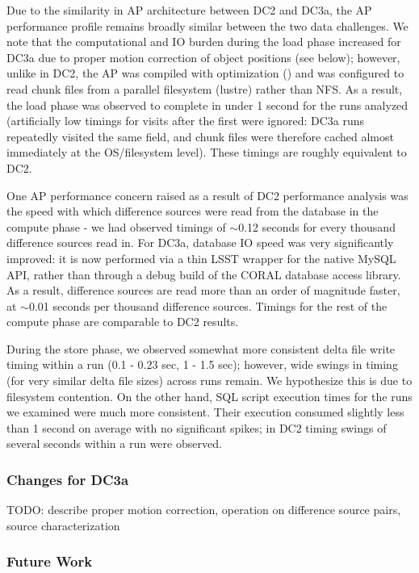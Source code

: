 Due to the similarity in AP architecture between DC2 and DC3a, the AP
performance profile remains broadly similar between the two data challenges.
We note that the computational and IO burden during the load phase increased
for DC3a due to proper motion correction of object positions (see below);
however, unlike in DC2, the AP was compiled with optimization () and
was configured to read chunk files from a parallel filesystem (lustre)
rather than NFS. As a result, the load phase was observed to complete in under
1 second for the runs analyzed (artificially low timings for visits after the
first were ignored: DC3a runs repeatedly visited the same field, and chunk
files were therefore cached almost immediately at the OS/filesystem level).
These timings are roughly equivalent to DC2.

One AP performance concern raised as a result of DC2 performance analysis was
the speed with which difference sources were read from the database in the
compute phase - we had observed timings of \ensuremath{\sim}0.12 seconds for
every thousand difference sources read in. For DC3a, database IO speed was
very significantly improved: it is now performed via a thin LSST wrapper for
the native MySQL API, rather than through a debug build of the CORAL database
access library. As a result, difference sources are read more than an order of
magnitude faster, at \ensuremath{\sim}0.01 seconds per thousand difference
sources. Timings for the rest of the compute phase are comparable to DC2
results.

During the store phase, we observed somewhat more consistent delta file write
timing within a run (0.1 - 0.23 sec, 1 - 1.5 sec); however, wide swings in
timing (for very similar delta file sizes) across runs remain. We hypothesize
this is due to filesystem contention. On the other hand, SQL script execution
times for the runs we examined were much more consistent. Their execution
consumed slightly less than 1 second on average with no significant spikes; in
DC2 timing swings of several seconds within a run were observed.

\subsubsection{Changes for DC3a}

TODO: describe proper motion correction, operation on difference source pairs,
source characterization

\subsubsection{Future Work}

